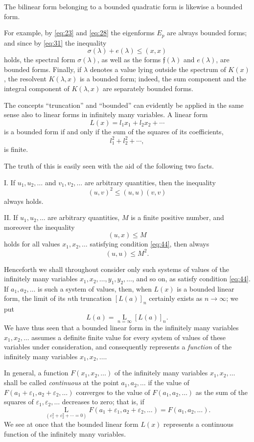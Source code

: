 \documentclass[b5paper,twoside]{article}
\newcommand{\originalpage}[1]{\phantomsection\label{origpage:#1}}
\begin{document}
The bilinear form belonging to a bounded quadratic form is likewise a bounded
form.

For example, by \eqref{eq:23} and \eqref{eq:28} the eigenforms $E_p$ are
always bounded forms; and since by \eqref{eq:31} the inequality
\[
  \sigma(\lambda)+e(\lambda)\le(x,x)
\]
holds, the spectral form $\sigma(\lambda)$, as well as the forms
$\mathfrak f(\lambda)$ and $e(\lambda)$, are bounded forms.  Finally, if
$\lambda$ denotes a value lying outside the spectrum of $K(x)$, the resolvent
$K(\lambda,x)$ is a bounded form; indeed, the sum component and the integral
component of $K(\lambda,x)$ are separately bounded forms.

The concepts ``truncation'' and ``bounded'' can evidently be applied in the
same sense also to linear forms in infinitely many variables.  A linear form
\[
  L(x)=l_1x_1+l_2x_2+\cdots
\]
is a bounded form if and only if the sum of the squares of its coefficients,
\[
  l_1^2+l_2^2+\cdots,
\]
is finite.

The truth of this is easily seen with the aid of the following two facts.

\textup{I.} If $u_1,u_2,\ldots$ and $v_1,v_2,\ldots$ are arbitrary
quantities, then the inequality
\[
  (u,v)^2\le(u,u)(v,v)
\]
always holds.

\textup{II.} If $u_1,u_2,\ldots$ are arbitrary quantities, $M$ is a finite
positive number, and moreover the inequality
\[
  (u,x)\le M
\]
holds for all values $x_1,x_2,\ldots$ satisfying condition \eqref{eq:44},
then always
\[
  (u,u)\le M^2.
\]

\originalpage{177}
Henceforth we shall throughout consider only such systems of values of the
infinitely many variables $x_1,x_2,\ldots,y_1,y_2,\ldots$, and so on, as
satisfy condition \eqref{eq:44}.  If $a_1,a_2,\ldots$ is such a system of
values, then, when $L(x)$ is a bounded linear form, the limit of its $n$th
truncation $[L(a)]_n$ certainly exists as $n\to\infty$; we put
\[
  L(a)=\mathop{\mathrm{L}}\limits_{n=\infty}[L(a)]_n.
\]
We have thus seen that a bounded linear form in the infinitely many variables
$x_1,x_2,\ldots$ assumes a definite finite value for every system of values
of these variables under consideration, and consequently represents a
\emph{function} of the infinitely many variables $x_1,x_2,\ldots$.

In general, a function $F(x_1,x_2,\ldots)$ of the infinitely many variables
$x_1,x_2,\ldots$ shall be called \emph{continuous} at the point
$a_1,a_2,\ldots$ if the value of
$F(a_1+\varepsilon_1,a_2+\varepsilon_2,\ldots)$ converges to the value of
$F(a_1,a_2,\ldots)$ as the sum of the squares of
$\varepsilon_1,\varepsilon_2,\ldots$ decreases to zero; that is, if
\[
  \mathop{\mathrm{L}}\limits_{(\varepsilon_1^2+\varepsilon_2^2+\cdots=0)}
  F(a_1+\varepsilon_1,a_2+\varepsilon_2,\ldots)
  =F(a_1,a_2,\ldots).
\]
We see at once that the bounded linear form $L(x)$ represents a continuous
function of the infinitely many variables.
\end{document}
